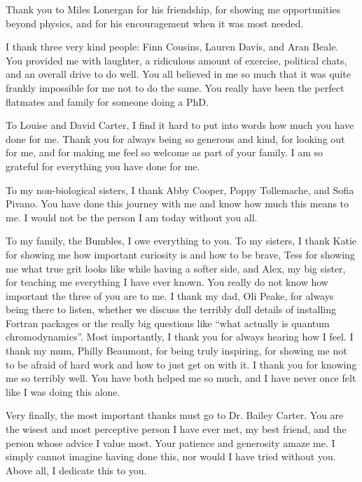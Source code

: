 Thank you to Miles Lonergan for his friendship, for showing me opportunities beyond physics, and for his encouragement when it was most needed.

I thank three very kind people: Finn Cousins, Lauren Davis,
and Aran Beale. You provided me with laughter, a ridiculous amount of exercise,
political chats, and an overall drive to do well. You all believed in me so much that it was
quite frankly impossible for me not to do the same. You really have been the perfect
flatmates and family for someone doing a PhD.

To Louise and David Carter, I find it hard to put into words how much you have done for me. Thank you for always being so generous and kind, for looking out for me, and for making me feel so welcome as part of your family. I am so grateful for everything you have done for me. 

To my non-biological sisters, I thank Abby Cooper, Poppy Tollemache, and Sofia Pivano.
You have done this journey with me and know how much this means to me. I would not
be the person I am today without you all.

To my family, the Bumbles, I owe everything to you.
To my sisters, I thank Katie for showing me how important curiosity is and how to be brave,
Tess for showing me what true grit looks like while having a softer side, and Alex, my big sister, 
for teaching me everything I have ever known. You really do not know how important the three of you are to me.
I thank my dad, Oli Peake, for always being there to listen, whether we discuss the terribly dull details of installing Fortran packages or the really big questions like
``what actually is quantum chromodynamics''. Most importantly, I thank you for always
hearing how I feel. I thank my mum, Philly Beaumont,
for being truly inspiring, for showing me not to be afraid of hard work and how to just get on with it.
I thank you for knowing me so terribly well. You have both helped me so much, and I have never once
felt like I was doing this alone.

Very finally, the most important thanks must go to Dr. Bailey Carter. You are the wisest and most perceptive person I have ever met, my best friend, and the person whose advice I value most. Your patience and generosity amaze me. I simply cannot imagine having done this, nor would I have tried without you. Above all, I dedicate this to you.
